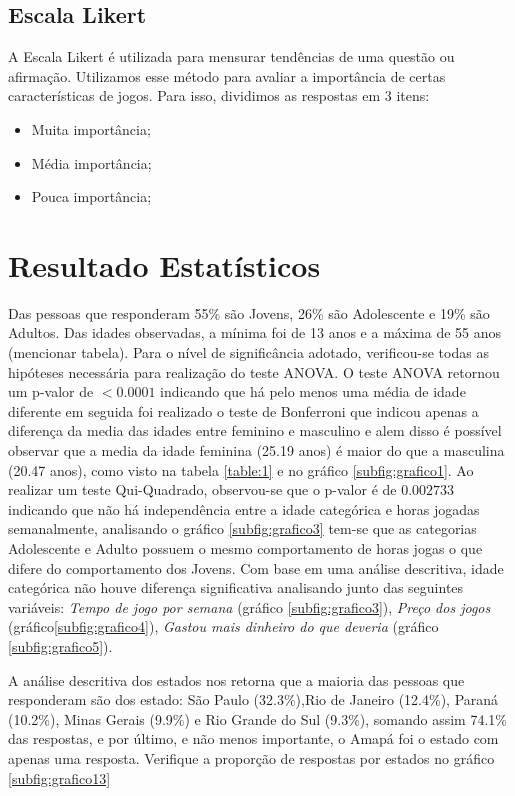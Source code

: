 \documentclass[11pt,a4paper]{article}
\begin{document}
\subsection{Escala Likert}

A Escala Likert é utilizada para mensurar tendências de uma questão ou afirmação. Utilizamos esse método para avaliar a importância de certas características de jogos. Para isso, dividimos as respostas em 3 itens:

\begin{itemize}[noitemsep,nolistsep]
\item Muita importância; 
\item Média importância;
\item Pouca importância;
\end{itemize}

\section{Resultado Estatísticos} 

Das pessoas que responderam 55\% são Jovens, 26\% são Adolescente e 19\% são Adultos. Das idades observadas, a mínima foi de 13 anos e a máxima de 55 anos (mencionar tabela). Para o nível de significância  adotado, verificou-se todas as hipóteses necessária para realização do teste ANOVA. O teste ANOVA retornou um p-valor de $<0.0001$ indicando que há pelo menos uma média de idade diferente em seguida foi realizado o teste de Bonferroni que indicou  apenas a diferença da media das idades entre feminino e masculino e alem disso é possível observar que a media da idade feminina (25.19 anos) é maior do que a masculina (20.47 anos), como visto na tabela \ref{table:1} e no gráfico \ref{subfig:grafico1}. Ao realizar um teste Qui-Quadrado, observou-se que o p-valor é de $0.002733$ indicando que não há independência entre a idade categórica e horas jogadas semanalmente, analisando o gráfico \ref{subfig:grafico3} tem-se que as categorias Adolescente e Adulto possuem o mesmo comportamento de horas jogas o que difere do comportamento dos  Jovens. Com base em uma análise descritiva, idade categórica não houve diferença significativa analisando junto das seguintes variáveis: \textit{Tempo de jogo por semana} (gráfico \ref{subfig:grafico3}), \textit{Preço dos jogos} (gráfico\ref{subfig:grafico4}), \textit{Gastou mais dinheiro do que deveria} (gráfico \ref{subfig:grafico5}).

A análise descritiva dos estados nos retorna que a maioria das pessoas que responderam são dos estado: São Paulo (32.3\%),Rio de Janeiro (12.4\%), Paraná (10.2\%), Minas Gerais (9.9\%) e Rio Grande do Sul (9.3\%), somando assim 74.1\% das respostas,  e por último, e não menos importante, o Amapá foi o estado com apenas uma resposta. Verifique a proporção de respostas por estados no gráfico \ref{subfig:grafico13}
\end{document}
